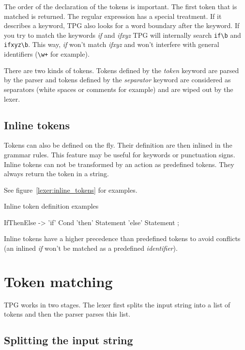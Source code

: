 The order of the declaration of the tokens is important. The first token that is matched is returned. The regular expression has a special treatment. If it describes a keyword, TPG also looks for a word boundary after the keyword. If you try to match the keywords \emph{if} and \emph{ifxyz} TPG will internally search \verb$if\b$ and \verb$ifxyz\b$. This way, \emph{if} won't match \emph{ifxyz} and won't interfere with general identifiers (\verb$\w+$ for example).

There are two kinds of tokens. Tokens defined by the \emph{token} keyword are parsed by the parser and tokens defined by the \emph{separator} keyword are considered as separators (white spaces or comments for example) and are wiped out by the lexer.

\subsection{Inline tokens}

Tokens can also be defined on the fly. Their definition are then inlined in the grammar rules.
This feature may be useful for keywords or punctuation signs.
Inline tokens can not be transformed by an action as predefined tokens.
They always return the token in a string.

See figure~\ref{lexer:inline_tokens} for examples.

\begin{code}
\caption{Inline token definition examples}					\label{lexer:inline_tokens}
\begin{verbatimtab}[4]
	IfThenElse ->
		'if' Cond
		'then' Statement
		'else' Statement
		;
\end{verbatimtab}
\end{code}

Inline tokens have a higher precedence than predefined tokens to avoid conflicts (an inlined \emph{if} won't be matched as a predefined \emph{identifier}).

\section{Token matching}									\label{lexer:token_matching}

TPG works in two stages.
The lexer first splits the input string into a list of tokens and then the parser parses this list.

\subsection{Splitting the input string}

